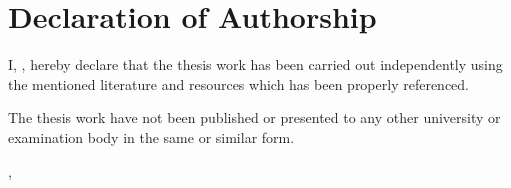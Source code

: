 \thispagestyle{empty}
\vspace*{0.8\textheight}
\chapter*{Declaration of Authorship}
I, \getAuthor, hereby declare that the thesis work has been carried out independently using the mentioned literature and resources which has been properly referenced.
\vspace*{0.01\textheight}

\noindent
The thesis work have not been published or presented to any other university or examination body in the same or similar form.

\vspace{20mm}
\noindent
\getSubmissionLocation{}, \getSubmissionDate{} \hspace{50mm} \getAuthor{}

\cleardoublepage{}
